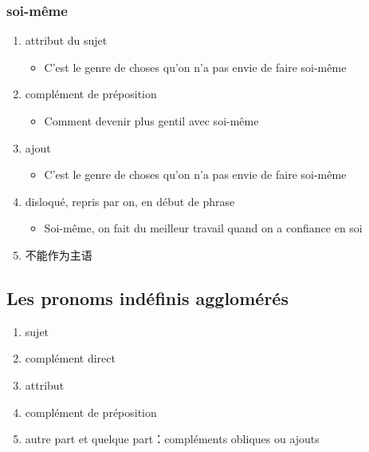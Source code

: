 \documentclass[UTF8]{report}
\begin{document}
\subsubsection{soi-même}
\begin{enumerate}
    \item attribut du sujet
    \begin{itemize}
        \item C’est le genre de choses qu’on n’a pas envie de faire soi-même
    \end{itemize}
    \item complément de préposition
    \begin{itemize}
        \item Comment devenir plus gentil avec soi-même
    \end{itemize}
    \item ajout
    \begin{itemize}
        \item C’est le genre de choses qu’on n’a pas envie de faire soi-même
    \end{itemize}
    \item disloqué, repris par on, en début de phrase
    \begin{itemize}
        \item Soi-même, on fait du meilleur travail quand on a confiance en soi
    \end{itemize}
    \item 不能作为主语
\end{enumerate}

\subsection{Les pronoms indéfinis agglomérés}
\begin{enumerate}
    \item sujet
    \item complément direct
    \item attribut
    \item complément de préposition
    \item autre part et quelque part：compléments obliques ou ajouts
\end{enumerate}
\end{document}
